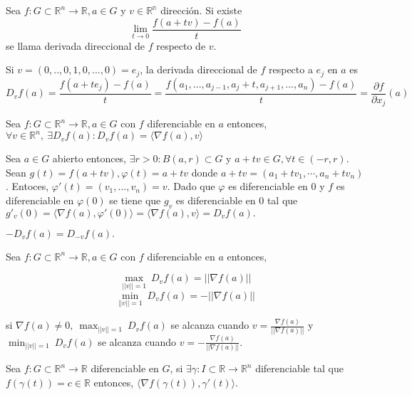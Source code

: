 \begin{defn}
Sea $f:G\subset \mathbb{R}^n \rightarrow \mathbb{R}, a\in G$ y $v\in\mathbb{R^n}$ dirección. Si existe \[ \lim_{t\rightarrow0} \frac{f(a + tv) - f(a)}{t}\] se llama derivada direccional de $f$ respecto de $v$.
\end{defn}

\begin{obs}
Si $v = (0,..,0,1,0,...,0) = e_j$, la derivada direccional de $f$ respecto a $e_j$ en $a$ es \[D_vf(a) = \frac{f(a + te_j) - f(a)}{t} = \frac{f(a_1,...,a_{j-1},a_j + t, a_{j+1},...,a_n) - f(a)}{t} = \frac{\partial f}{\partial x_j}(a) \] 
\end{obs}

\begin{prop}
Sea $f:G\subset \mathbb{R}^n \rightarrow \mathbb{R}, a\in G$ con $f$ diferenciable en $a$ entonces, $\forall v\in\mathbb{R}^n, \ \exists D_vf(a): D_vf(a)= \langle \nabla{f(a)} {,}v\rangle$
\end{prop}

\begin{dem}
Sea $a\in G$ abierto entonces, $\exists r>0: B(a,r)\subset G$ y $a + tv \in G, \forall t \in(-r,r).$ Sean $g(t) = f(a + tv), \varphi(t) = a + tv$ donde $a + tv = (a_1 + t v_1, \cdots , a_n + t v_n)$. Entoces, $\varphi'(t)=(v_1,...,v_n)=v$. Dado que $\varphi$ es diferenciable en $0$ y $f$ es diferenciable en $\varphi(0)$ se tiene que $g_v$ es diferenciable en $0$ tal que $ g'_v(0) = \langle \nabla f(a), \varphi'(0)\rangle = \langle \nabla f(a), v\rangle = D_vf(a).$
\end{dem}

\begin{obs}
$-D_vf(a)=D_{-v}f(a).$
\end{obs}

\begin{prop}
Sea $f:G\subset \mathbb{R}^n \rightarrow \mathbb{R}, a\in G$ con $f$ diferenciable en $a$ entonces,

\[ \max_{||v||=1} \ D_vf(a) = ||\nabla{f(a)}||\]
\[ \min_{||v||=1} \ D_vf(a) = -||\nabla{f(a)}||\]

si $ \nabla{f(a)} \neq 0, \ \max_{||v||=1} \ D_vf(a)$ se alcanza cuando $ v = \frac{\nabla{f(a)}}{||\nabla{f(a)}||}$ y $\min_{||v||=1} \ D_vf(a)$ se alcanza cuando $ v = -\frac{\nabla{f(a)}}{||\nabla{f(a)}||}$.
\end{prop}

\begin{prop}
Sea $f:G\subset \mathbb{R}^n \rightarrow \mathbb{R}$ diferenciable en $G$, si $\exists \gamma :I\subset\mathbb{R}\rightarrow\mathbb{R}^n$ diferenciable tal que $f(\gamma(t))= c\in\mathbb{R}$ 
entonces, $\langle \nabla{f(\gamma(t))} {,}\gamma'(t)\rangle$.
\end{prop}

